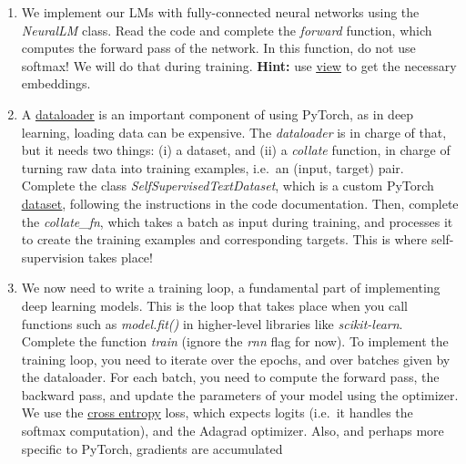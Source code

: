 \documentclass[11pt,a4paper]{article}
\begin{document}
\begin{enumerate}[label=(\alph*)]
    \item We implement our LMs with fully-connected neural networks using the
          \emph{NeuralLM} class.
          Read the code and complete the \emph{forward} function, which computes
          the forward pass of the network.
          In this function, do not use softmax! We will do that during training.
          \textbf{Hint:} use
          \href{https://pytorch.org/docs/stable/generated/torch.Tensor.view.html}{\underline{view}}
          to get the necessary embeddings.
    \item A \href{https://pytorch.org/tutorials/beginner/basics/data_tutorial.html}{\underline{dataloader}}
          is an important component of using PyTorch, as in deep learning,
          loading data can be expensive.
          The \emph{dataloader} is in charge of that, but it needs two things: 
          (i) a dataset, and (ii) a \emph{collate} function, in charge of 
          turning raw data into training examples, i.e.\ an (input, target) 
          pair. 
          Complete the class \emph{SelfSupervisedTextDataset}, which is a custom
          PyTorch
          \href{https://pytorch.org/tutorials/beginner/data_loading_tutorial.html}{\underline{dataset}},
          following the instructions in the code documentation.
          Then, complete the \emph{collate\_fn}, which takes a batch as input
          during training, and processes it to create the training examples and
          corresponding targets. This is where self-supervision takes place!
    \item We now need to write a training loop, a fundamental part of
          implementing deep learning models.
          This is the loop that takes place when you call functions such as
          \emph{model.fit()} in higher-level libraries like \emph{scikit-learn}.
          Complete the function \emph{train} (ignore the \emph{rnn} flag for
          now).
          To implement the training loop, you need to iterate over the epochs,
          and over batches given by the dataloader.
          For each batch, you need to compute the forward pass, the backward
          pass, and update the parameters of your model using the optimizer.
          We use the
          \href{https://pytorch.org/docs/stable/generated/torch.nn.CrossEntropyLoss.html}{\underline{cross entropy}}
          loss, which expects logits (i.e.\ it handles the softmax computation),
          and the Adagrad optimizer.
          Also, and perhaps more specific to PyTorch, gradients are accumulated

\end{enumerate}
\end{document}
